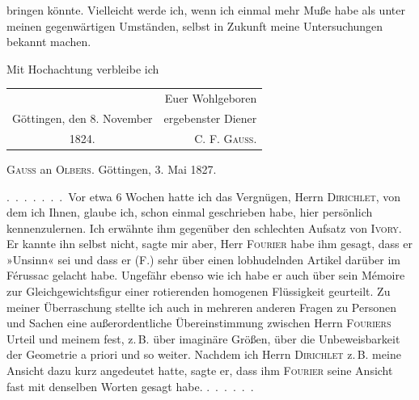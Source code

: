 bringen könnte. Vielleicht werde ich, wenn ich einmal
mehr Muße habe als unter meinen gegenwärtigen Umständen, selbst
in Zukunft meine Untersuchungen bekannt machen.

Mit Hochachtung verbleibe ich
\begin{center}
\begin{tabular}{@{}l@{\qquad}r@{}}
 & Euer Wohlgeboren\\
Göttingen, den 8. November & ergebenster Diener\\
\multicolumn{1}{c}{1824.} & \textsc{C. F. Gauss.}
\end{tabular}
\end{center}
\medskip

\begin{center}
\textsc{Gauss} an \textsc{Olbers}. Göttingen, 3. Mai 1827.
\end{center}

.\ .\ .\ .\ .\ .\ .\ Vor etwa 6 Wochen hatte ich das Vergnügen, Herrn \textsc{Dirichlet},
von dem ich Ihnen, glaube ich, schon einmal geschrieben habe, hier persönlich
kennenzulernen. Ich erwähnte ihm gegenüber den schlechten Aufsatz von
\textsc{Ivory}. Er kannte ihn selbst nicht, sagte mir aber, Herr \textsc{Fourier}
habe ihm gesagt, dass er »Unsinn« sei und dass er (F.) sehr über einen
lobhudelnden Artikel darüber im Férussac gelacht habe. Ungefähr ebenso wie
ich habe er auch über sein Mémoire zur Gleichgewichtsfigur einer
rotierenden homogenen Flüssigkeit geurteilt. Zu meiner Überraschung stellte ich auch in
mehreren anderen Fragen zu Personen und Sachen eine außerordentliche
Übereinstimmung zwischen Herrn \textsc{Fouriers} Urteil und meinem fest, z.\,B.
über imaginäre Größen, über die Unbeweisbarkeit der Geometrie a priori und so
weiter. Nachdem ich Herrn \textsc{Dirichlet} z.\,B. meine Ansicht dazu kurz
angedeutet hatte, sagte er, dass ihm \textsc{Fourier} seine Ansicht fast mit denselben
Worten gesagt habe.
.\ .\ .\ .\ .\ .

